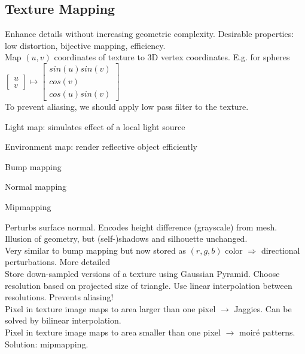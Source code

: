 \subsection*{Texture Mapping}
Enhance details without increasing geometric complexity. Desirable properties: low distortion, bijective mapping, efficiency. \\
 Map $(u,v)$ coordinates of texture to 3D vertex coordinates. E.g. for spheres
$\begin{bmatrix}
        u \\ v
\end{bmatrix} \mapsto 
\begin{bmatrix}
        sin(u)sin(v) \\
        cos(v)\\
        cos(u)sin(v)
\end{bmatrix}$\\
 To prevent aliasing, we should apply low pass filter to the texture. \\
\begin{compactitem}
    \item Light map: simulates effect of a local light source
    \item Environment map: render reflective object efficiently
    \item Bump mapping
    \item Normal mapping
    \item Mipmapping
\end{compactitem}
Perturbs surface normal. Encodes height difference (grayscale) from mesh. Illusion of geometry, but (self-)shadows and silhouette unchanged. \\
Very similar to bump mapping but now stored as $(r,g,b)$ color $\Rightarrow$ directional perturbations. More detailed \\
Store down-sampled versions of a texture using Gaussian Pyramid. Choose resolution based on projected size of triangle. Use linear interpolation between resolutions. Prevents aliasing!\\
Pixel in texture image maps to area larger than one pixel $\rightarrow$ Jaggies. Can be solved by bilinear interpolation. \\
Pixel in texture image maps to area smaller than one pixel $\rightarrow$ moiré patterns. Solution: mipmapping.